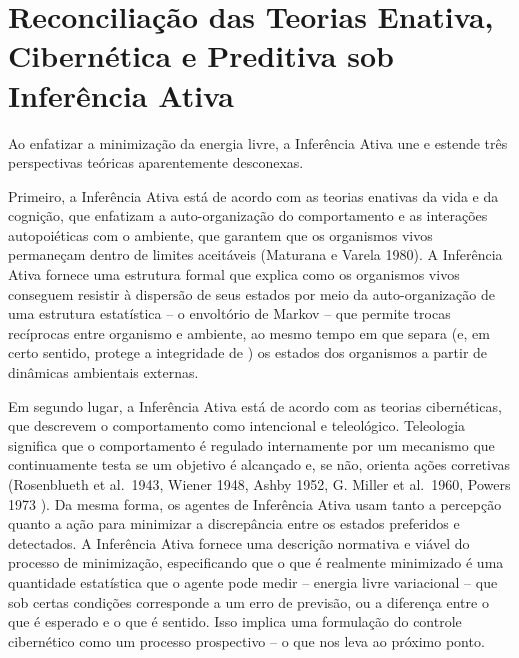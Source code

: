 \documentclass[
  12pt,
]{book}
\begin{document}
\hypertarget{reconciliauxe7uxe3o-das-teorias-enativa-cibernuxe9tica-e-preditiva-sob-inferuxeancia-ativa}{%
\section{Reconciliação das Teorias Enativa, Cibernética e Preditiva sob Inferência Ativa}\label{reconciliauxe7uxe3o-das-teorias-enativa-cibernuxe9tica-e-preditiva-sob-inferuxeancia-ativa}}

Ao enfatizar a minimização da energia livre, a Inferência Ativa une e estende três perspectivas teóricas aparentemente desconexas.

Primeiro, a Inferência Ativa está de acordo com as teorias enativas da vida e da cognição, que enfatizam a auto-organização do comportamento e as interações autopoiéticas com o ambiente, que garantem que os organismos vivos permaneçam dentro de limites aceitáveis (Maturana e Varela 1980). A Inferência Ativa fornece uma estrutura formal que explica como os organismos vivos conseguem resistir à dispersão de seus estados por meio da auto-organização de uma estrutura estatística -- o envoltório de Markov -- que permite trocas recíprocas entre organismo e ambiente, ao mesmo tempo em que separa (e, em certo sentido, protege a integridade de ) os estados dos organismos a partir de dinâmicas ambientais externas.

Em segundo lugar, a Inferência Ativa está de acordo com as teorias cibernéticas, que descrevem o comportamento como intencional e teleológico. Teleologia significa que o comportamento é regulado internamente por um mecanismo que continuamente testa se um objetivo é alcançado e, se não, orienta ações corretivas (Rosenblueth et al.~1943, Wiener 1948, Ashby 1952, G. Miller et al.~1960, Powers 1973 ). Da mesma forma, os agentes de Inferência Ativa usam tanto a percepção quanto a ação para minimizar a discrepância entre os estados preferidos e detectados. A Inferência Ativa fornece uma descrição normativa e viável do processo de minimização, especificando que o que é realmente minimizado é uma quantidade estatística que o agente pode medir -- energia livre variacional -- que sob certas condições corresponde a um erro de previsão, ou a diferença entre o que é esperado e o que é sentido. Isso implica uma formulação do controle cibernético como um processo prospectivo -- o que nos leva ao próximo ponto.
\end{document}
